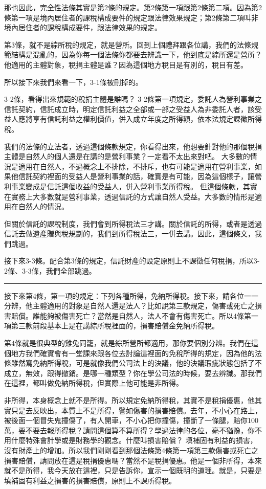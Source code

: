 \documentclass[oneside,sub3section]{ctexbook}
\begin{document}
那也因此，完全性法條其實是第2條的規定。第2條第一項跟第2條第二項。因為第2條第一項是境內居住者的課稅構成要件的規定跟法律效果規定；第2條第二項叫非境內居住者的課稅構成要件，跟法律效果的規定。

第3條，就不是綜所稅的規定，就是營所。回到上個禮拜跟各位講，我們的法條規範結構是混亂的，因為你每一個法條你都要去辨識一下，他到底是綜所還是營所？他適用的主體對象，稅捐主體是誰？因為這個地方稅目是有別的，稅目有差。

所以接下來我們來看一下，3-1條被刪掉的。

3-2條，看得出來規範的稅捐主體是誰嗎？
3-2條第一項規定，委託人為營利事業之信託契約，信託成立時，明定信託利益之全部或一部之受益人為非委託人者，該受益人應將享有信託利益之權利價值，併入成立年度之所得額，依本法規定課徵所得稅。

我們的法條的立法者，透過這個條款規定，你看得出來，他想要針對他的那個稅捐主體是自然人的個人還是在講的是營利事業？一定看不太出來對吧。
大多數的情況是適用在自然人，不過概念上不排除，不排斥，也有可能是適用在營利事業，如果他信託契約裡面的受益人是營利事業的話，確實是有可能，因為這個樣子，讓營利事業變成是信託這個收益的受益人，併入營利事業所得稅。
但這個條款，其實在實務上大多數就是營利事業，透過信託的方式讓自然人受益。大多數的情形是適用在自然人的情況。

但關於信託的課稅制度，我們會到所得稅法三才講。關於信託的所得，或者是透過信託去做遺產贈與稅規劃的，我們到所得稅法三，一併去講。因此，這個條文，我們跳過。

接下來3-3條。配合第3條的規定，信託財產的設定原則上不課徵任何稅捐，所以3-2條、3-3條，我們全部跳過。

\begin{center}\rule{0.5\linewidth}{0.5pt}\end{center}

接下來第4條，第一項的規定：下列各種所得，免納所得稅。接下來，請各位一一分辨，他主體適用的對象是自然人還是法人？比如說第三款規定，傷害或死亡之損害賠償。誰能夠被傷害死亡？當然是自然人，法人不會有傷害死亡。所以4條第一項第三款前段基本上是在講綜所稅裡面的，損害賠償金免納所得稅。

第4條就是很典型的雞兔同籠，就是綜所營所都適用，那你要個別分辨。我們在這個地方我們確實會有一堂課來跟各位去討論這裡面的免稅所得的規定，因為他的法條雖然寫免納所得稅，可是就像我們公司法上的決議，他的決議瑕疵狀態包括了不成立，無效，跟得撤銷。是哪一種類型？你在學公司法的時候，要去辨識。那我們在這裡，都叫做免納所得稅，但實際上他可能是非所得。

非所得，本身概念上就不是所得。所以規定免納所得稅，其實不是稅捐優惠，他其實只是去反映出，本質上不是所得，譬如傷害的損害賠償。去年，不小心在路上，被後面一個冒失鬼撞傷了，有人開車，不小心把你撞傷，撞斷了一條腿，賠你100萬，要不要去報所得稅？請問這個算不算所得？學過法律的各位，毫不猶豫，你不用什麼特殊會計學或是財務學的觀念。什麼叫損害賠償？ 填補固有利益的損害，沒有財產上的增加。所以我們剛剛看到那個法條第4條第一項第三款傷害或死亡之損害賠償，請問放在這是稅捐優惠嗎？當然不是稅捐優惠。他是一個非所得，本來就不是所得，我今天放在這裡，只是告訴你，宣示一個既明的道理。就是，只要是填補固有利益之損害的損害賠償，原則上不課所得稅。
\end{document}

